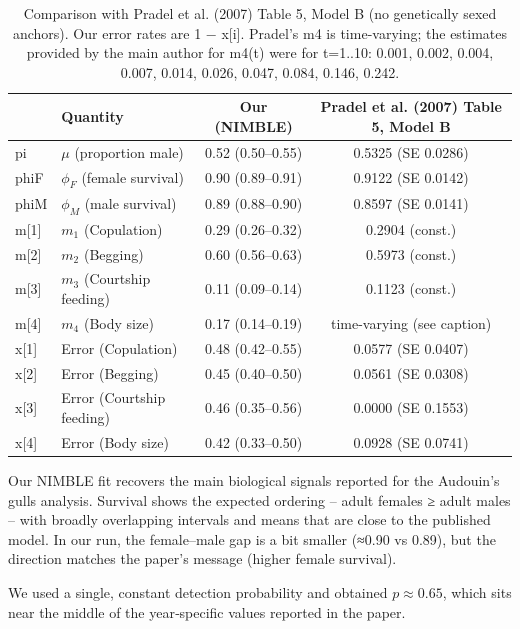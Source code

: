 \documentclass[
  12pt,
]{krantz}
\begin{document}
\begin{table}

\caption{\label{tab:unnamed-chunk-394}Comparison with Pradel et al. (2007) Table 5, Model B (no genetically sexed anchors). Our error rates are 1 − x[i]. Pradel's m4 is time-varying; the estimates provided by the main author for m4(t) were for t=1..10: 0.001, 0.002, 0.004, 0.007, 0.014, 0.026, 0.047, 0.084, 0.146, 0.242.}
\centering
\begin{tabular}[t]{l|l|c|c}
\hline
  & Quantity & Our (NIMBLE) & Pradel et al. (2007) Table 5, Model B\\
\hline
pi & $\mu$ (proportion male) & 0.52 (0.50–0.55) & 0.5325 (SE 0.0286)\\
\hline
phiF & $\phi_F$ (female survival) & 0.90 (0.89–0.91) & 0.9122 (SE 0.0142)\\
\hline
phiM & $\phi_M$ (male survival) & 0.89 (0.88–0.90) & 0.8597 (SE 0.0141)\\
\hline
m[1] & $m_1$ (Copulation) & 0.29 (0.26–0.32) & 0.2904 (const.)\\
\hline
m[2] & $m_2$ (Begging) & 0.60 (0.56–0.63) & 0.5973 (const.)\\
\hline
m[3] & $m_3$ (Courtship feeding) & 0.11 (0.09–0.14) & 0.1123 (const.)\\
\hline
m[4] & $m_4$ (Body size) & 0.17 (0.14–0.19) & time-varying (see caption)\\
\hline
x[1] & Error (Copulation) & 0.48 (0.42–0.55) & 0.0577 (SE 0.0407)\\
\hline
x[2] & Error (Begging) & 0.45 (0.40–0.50) & 0.0561 (SE 0.0308)\\
\hline
x[3] & Error (Courtship feeding) & 0.46 (0.35–0.56) & 0.0000 (SE 0.1553)\\
\hline
x[4] & Error (Body size) & 0.42 (0.33–0.50) & 0.0928 (SE 0.0741)\\
\hline
\end{tabular}
\end{table}

Our NIMBLE fit recovers the main biological signals reported for the Audouin's gulls analysis. Survival shows the expected ordering -- adult females ≥ adult males -- with broadly overlapping intervals and means that are close to the published model. In our run, the female--male gap is a bit smaller (≈0.90 vs 0.89), but the direction matches the paper's message (higher female survival).

We used a single, constant detection probability and obtained \(p≈0.65\), which sits near the middle of the year‐specific values reported in the paper.
\end{document}
